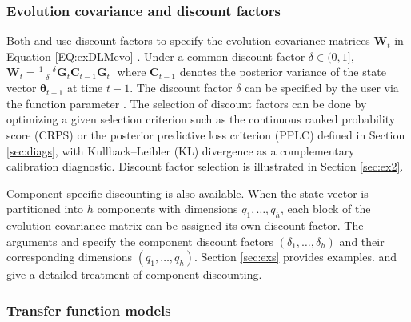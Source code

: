 \documentclass{jss}
\newcommand{\vect}[1]{\boldsymbol{#1}}
\newcommand{\mat}[1]{\mathbf{#1}}
\begin{document}

\subsubsection{Evolution covariance and discount factors}
\label{sec:dfs}

Both  and  use discount factors to specify the evolution covariance matrices $\mat{W}_t$ in Equation \eqref{EQ:exDLMevo} \citep[see][and references therein]{west1997bayesian,prado_ferreira_west2021}. Under a common discount factor $\delta \in (0,1],$ $\mat{W}_t = \frac{1-\delta}{\delta} \mat{G}_t \mat{C}_{t-1} \mat{G}_t^\top$ where $\mat{C}_{t-1}$ denotes the posterior variance of the state vector $\vect{\theta}_{t-1}$ at time $t-1$. The discount factor $\delta$ can be specified by the user via the function parameter . The selection of discount factors can be done by optimizing a given selection criterion such as the continuous ranked probability score (CRPS) or the posterior predictive loss criterion (PPLC) defined in Section \ref{sec:diags}, with Kullback--Leibler (KL) divergence as a complementary calibration diagnostic.  Discount factor selection is illustrated in Section \ref{sec:ex2}.

Component-specific discounting is also available. When the state vector is partitioned into $h$ components with dimensions $q_1,\ldots,q_h$, each block of the evolution covariance matrix can be assigned its own discount factor.
The arguments  and  specify the component discount factors $(\delta_1,\dots,\delta_h)$ and their corresponding dimensions $(q_1,\dots,q_h)$.  Section \ref{sec:exs} provides examples.  \cite{west1997bayesian} and \cite{prado_ferreira_west2021} give a detailed treatment of component discounting.


\subsubsection{Transfer function models}
\label{sec:tf}
\end{document}
